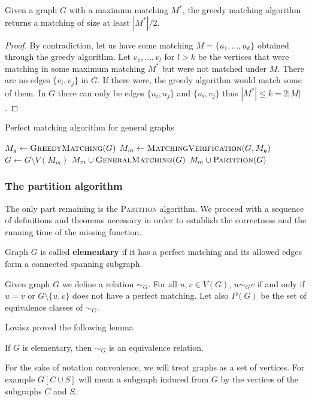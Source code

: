 \begin{lemma}
Given a graph $G$ with a maximum matching $M^*$, the greedy matching algorithm returns a matching of size at least $|M^*|/2$.
\end{lemma}
\begin{proof}
By contradiction, let us have some matching $M=\{u_1,...,u_k\}$ obtained through the greedy algorithm. Let $v_1,...,v_l$ for $l > k$ be the vertices that were matching in some maximum matching $M^*$ but were not matched under $M$. There are no edges $\{v_i,v_j\}$ in $G$. If there were, the greedy algorithm would match some of them. In $G$ there can only be edges $\{u_i,u_j\}$ and $\{u_i,v_j\}$ thus $|M^*| \le k = 2|M|$.
\end{proof}

\begin{algorithm}
\caption{Perfect matching algorithm for general graphs}
\begin{algorithmic}[1]
\State $M_g \gets \Call{GreedyMatching}{G}$
\State $M_m \gets \Call{MatchingVerification}{G,M_g}$
\State $G \gets G \setminus V(M_m)$
    \State \Return $M_m \cup \Call{GeneralMatching}{G}$
\Else
    \State \Return $M_m \cup \Call{Partition}{G}$
\EndIf
\EndFunction
\end{algorithmic}
\end{algorithm}

\subsubsection{The partition algorithm}
The only part remaining is the \textsc{Partition} algorithm. We proceed with a sequence of definitions and theorems necessary in order to establish the correctness and the running time of the missing function.
\begin{definition}
Graph $G$ is called \textbf{elementary} if it has a perfect matching and its allowed edges form a connected spanning subgraph.
\end{definition}
\begin{definition}
Given graph $G$ we define a relation $\sim_G$. For all $u,v \in V(G)$, $u \sim_G v$ if and only if $u=v$ or $G \setminus \{u,v\}$ does not have a perfect matching. Let also $P(G)$ be the set of equivalence classes of $\sim_G$.
\end{definition}
Lovász \cite{lovasz2} proved the following lemma
\begin{theorem}
If $G$ is elementary, then $\sim_G$ is an equivalence relation.
\end{theorem}
For the sake of notation convenience, we will treat graphs as a set of vertices. For example $G[C \cup S]$ will mean a subgraph induced from $G$ by the vertices of the subgraphs $C$ and $S$.

